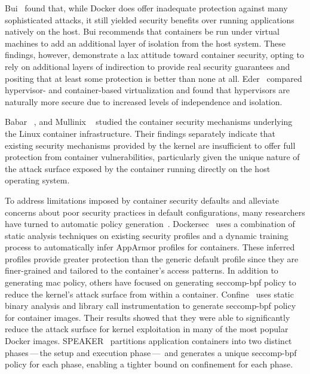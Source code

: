 \documentclass[
  fontsize=12pt,
  titlepage=firstiscover,
  paper=letter,
oneside,
  cleardoublepage=plain,
  parskip=half-,
  DIV=10,
  parindent,
  appendixprefix,
  chapterprefix,
  listof=totoc,
]{scrbook}
\begin{document}
Bui~\cite{bui2015_docker_analysis} found that, while Docker does offer inadequate
protection against many sophisticated attacks, it still yielded security benefits over
running applications natively on the host. Bui recommends that containers be run under
virtual machines to add an additional layer of isolation from the host system. These
findings, however, demonstrate a lax attitude toward container security, opting to rely on
additional layers of indirection to provide real security guarantees and positing that at
least some protection is better than none at all.
Eder~\cite{eder2016_hypervisor_container} compared hypervisor- and container-based
virtualization and found that hypervisors are naturally more secure due to increased
levels of independence and isolation.

Babar \etal~\cite{babar2017_understanding}, and Mullinix
\etal~\cite{mullinix2020_security_measures} studied the container security mechanisms
underlying the Linux container infrastructure. Their findings separately indicate that
existing security mechanisms provided by the kernel are insufficient to offer full
protection from container vulnerabilities, particularly given the unique nature of the
attack surface exposed by the container running directly on the host operating system.

To address limitations imposed by container security defaults and alleviate concerns about
poor security practices in default configurations, many researchers have turned to
automatic policy generation~\cite{loukidis2018_dockersec, ghavamania2020_confine,
lei2017_speaker}.  Dockersec~\cite{loukidis2018_dockersec} uses a combination of static
analysis techniques on existing security profiles and a dynamic training process to
automatically infer AppArmor profiles for containers.  These inferred profiles provide
greater protection than the generic default profile since they are finer-grained and
tailored to the container's access patterns. In addition to generating \gls{mac} policy,
others have focused on generating seccomp-bpf policy to reduce the kernel's attack surface
from within a container. Confine~\cite{ghavamania2020_confine} uses static binary analysis
and library call instrumentation to generate seccomp-bpf policy for container images.
Their results showed that they were able to significantly reduce the attack surface for
kernel exploitation in many of the most popular Docker images.
SPEAKER~\cite{lei2017_speaker} partitions application containers into two distinct
phases\,---\,the setup and execution phase\,---\, and generates a unique seccomp-bpf
policy for each phase, enabling a tighter bound on confinement for each phase.
\end{document}
